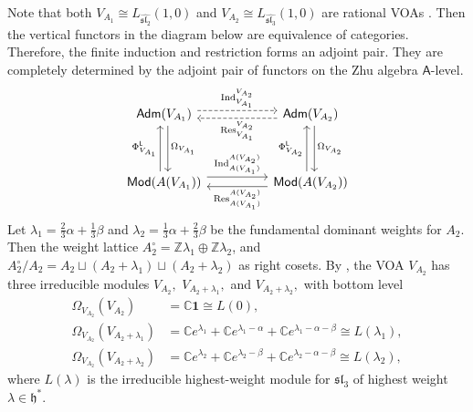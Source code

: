 \documentclass[12pt,a4paper,reqno]{amsart}
\numberwithin{equation}{section}
\numberwithin{equation}{section}
\theoremstyle{definition}
\newcommand{\Z}{\mathbb{Z}}
\def \C {\mathbb{C}}
\def\la{\lambda}
\def \al{\alpha}
\def\hr{\hookrightarrow}
\def \b {\beta}
\def \op {\oplus}
\def \vac {\mathbf{1}}
\def \h {\mathfrak{h}}
\def\L{\mathcal{L}}
\def\Om{\Omega}
\def\L{\mathsf{L}}
\def\L{\mathsf{L}}
\def\A{\mathsf{A}}
\def\sl{\mathfrak{sl}}
\begin{document}
	
	Note that both $V_{A_1}\cong L_{\widehat{\sl_2}}(1,0)$ and $V_{A_2}\cong L_{\widehat{\sl_3}}(1,0)$ are rational VOAs \cite{D,DLM97}. Then the vertical functors in the diagram below are equivalence of categories. Therefore, the finite induction and restriction forms an adjoint pair. %
	They are completely determined by the adjoint pair of functors on the Zhu algebra $\A$-level. 
	\begin{equation}\label{eq:commdiagramA1A2}
		\begin{tikzcd}[scale=1.5,row sep=huge, column sep = huge]
			\mathsf{Adm}(V_{A_1})\arrow[r,dashed,shift left=2pt,"\mathrm{Ind}^{V_{A_2}}_{V_{A_1}}"]\arrow[d,shift left=2pt,"\Om_{V_{A_1}}"]& \mathsf{Adm}(V_{A_2})\arrow[l,dashed,shift left=2pt,"\mathrm{Res}^{V_{A_2}}_{V_{A_1}}"]\arrow[d,shift left=2pt,"\Om_{V_{A_2}}"]\\
			\mathsf{Mod}(A(V_{A_1}))\arrow[r,shift left=3pt,"\mathrm{Ind}^{A(V_{A_2})}_{A(V_{A_1})}"]\arrow[u,shift left=2pt,"\Phi_{V_{A_1}}^\L"]& \mathsf{Mod}(A(V_{A_2})) \arrow[l,shift left=2pt,"\mathrm{Res}^{A(V_{A_2})}_{A(V_{A_1})}"]\arrow[u,shift left=2pt,"\Phi ^\L _{V_{A_2}}"]
		\end{tikzcd}
	\end{equation}
	Let $\la_1=\frac{2}{3}\al+\frac{1}{3}\b$ and $\la_2=\frac{1}{3}\al+\frac{2}{3}\b$ be the fundamental dominant weights for $A_2$. Then the weight lattice $A_2^\circ=\Z\la_1\op \Z \la_2$, and $A_2^\circ/A_2=A_2\sqcup (A_2+\la_1)\sqcup (A_2+\la_2)$ as right cosets. By \cite[Theorem 3.1]{D}, the VOA $V_{A_2}$ has three irreducible modules $V_{A_2},$ $V_{A_2+\la_1},$ and  $V_{A_2+\la_2},$ with bottom level
	\begin{align*}
		\Om_{V_{A_2}}(V_{A_2})&=\C \vac\cong L(0),\\
		\Om_{V_{A_2}}(V_{A_2+\la_1})&=\C e^{\la_1}+\C e^{\la_1-\al}+\C e^{\la_1-\al-\b}\cong L(\la_1),\\ 
		\Om_{V_{A_2}}(V_{A_2+\la_2})&=\C e^{\la_2}+\C e^{\la_2-\b}+\C e^{\la_2-\al-\b}\cong L(\la_2),
	\end{align*}
	where $L(\la)$ is the irreducible highest-weight module for $\sl_3$ of highest weight $\la\in \h^\ast$. 
	
	
\end{document}
